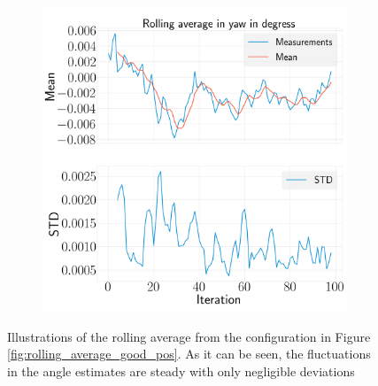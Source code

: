 \documentclass[../Head/report.tex]{subfiles}
\begin{document}
\begin{figure}[H]
\begin{subfigure}[t]{.30\textwidth}
        \caption{}
        \label{fig:rolling_average_in_pitch_test1}
    \end{subfigure}
     \hspace{0.2em}
    \begin{subfigure}[t]{.30\textwidth}
        \centering
        \includegraphics[width=\textwidth]{../Figures/analyse_rolling_average/test1/Calculated_rolling_average_in_yaw_with_mean_and_STD.png}
        \caption{}
        \label{fig:rolling_average_in_yaw_test1}
    \end{subfigure}
    \caption{Illustrations of the rolling average from the configuration in Figure \ref{fig:rolling_average_good_pos}. As it can be seen, the fluctuations in the angle estimates are steady with only negligible deviations}
    \label{fig:rolling_average_angle_test1}
\end{figure}
\end{document}
